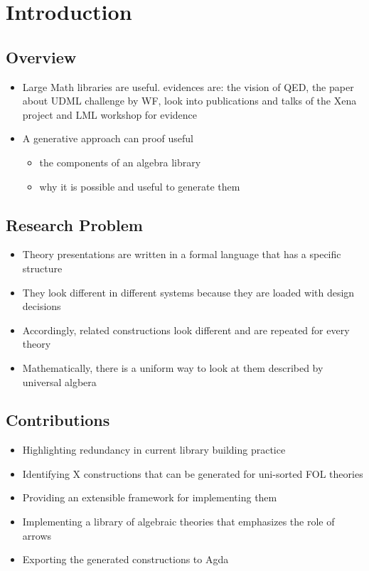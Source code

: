 \documentclass[]{article}
\begin{document}
    
\section{Introduction}
\subsection{Overview}
\begin{itemize}
    \item Large Math libraries are useful. evidences are: the vision of QED, the paper about UDML challenge by WF, look into publications and talks of the Xena project and LML workshop for evidence 
    \item A generative approach can proof useful 
    \begin{itemize}
        \item the components of an algebra library 
        \item why it is possible and useful to generate them 
    \end{itemize}
\end{itemize}

\subsection{Research Problem}
\begin{itemize}
    \item Theory presentations are written in a formal language that has a specific structure 
    \item They look different in different systems because they are loaded with design decisions 
    \item Accordingly, related constructions look different and are repeated for every theory 
    \item Mathematically, there is a uniform way to look at them described by universal algbera 
\end{itemize}    
    
\subsection{Contributions}
\begin{itemize}
    \item Highlighting redundancy in current library building practice 
    \item Identifying X constructions that can be generated for uni-sorted FOL theories 
    \item Providing an extensible framework for implementing them 
    \item Implementing a library of algebraic theories that emphasizes the role of arrows 
    \item Exporting the generated constructions to Agda 
\end{itemize}    
\end{document}
